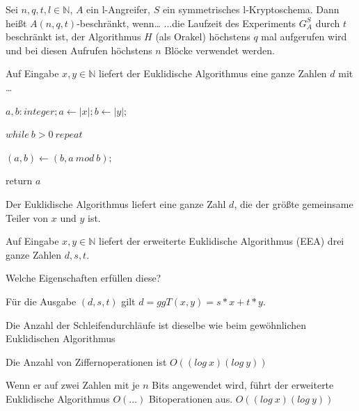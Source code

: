 \documentclass[avery5371, frame]{flashcards}
\begin{document}
\begin{flashcard}{Sei $n,q,t,l\in\mathbb{N}$, $A$ ein l-Angreifer, $S$ ein symmetrisches l-Kryptoschema. Dann heißt $A(n,q,t)$-beschränkt, wenn\dots }
    ...die Laufzeit des Experiments $G^S_A$ durch $t$ beschränkt ist, der Algorithmus $H$ (als Orakel) höchstens $q$ mal aufgerufen wird und bei diesen Aufrufen höchstens $n$ Blöcke verwendet werden.
\end{flashcard}

\begin{flashcard}[Zahlentheorie]{Auf Eingabe $x,y\in\mathbb{N}$ liefert der Euklidische Algorithmus eine ganze Zahlen $d$ mit \dots}

    \begin{itemize*}
        \item[] $a,b:integer;a\leftarrow |x|;b\leftarrow |y|;$
        \item[] $while\ b> 0\ repeat$
        \begin{itemize*}
            \item[] $(a,b)\leftarrow (b,a\ mod\ b);$ %
        \end{itemize*}
        \item[] return $a$
    \end{itemize*}

    Der Euklidische Algorithmus liefert eine ganze Zahl $d$, die der größte gemeinsame Teiler von $x$ und $y$ ist.
\end{flashcard}

\begin{flashcard}[Zahlentheorie]{Auf Eingabe $x,y\in\mathbb{N}$ liefert der erweiterte Euklidische Algorithmus (EEA) drei ganze Zahlen $d,s,t$.

        Welche Eigenschaften erfüllen diese?}

    \begin{enumerate*}
        \item Für die Ausgabe $(d,s,t)$ gilt $d= ggT(x,y) =s*x+t*y$.
        \item Die Anzahl der Schleifendurchläufe ist dieselbe wie beim gewöhnlichen Euklidischen Algorithmus
        \item Die Anzahl von Ziffernoperationen ist $O((log\ x)(log\ y))$
    \end{enumerate*}
\end{flashcard}

\begin{flashcard}[Zahlentheorie]{Wenn er auf zwei Zahlen mit je $n$ Bits angewendet wird, führt der erweiterte Euklidische Algorithmus $O(\dots)$ Bitoperationen aus.}
    $O((log\ x)(log\ y))$
\end{flashcard}
\end{document}
